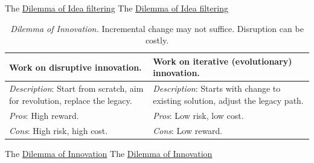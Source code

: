 The \href{table:idea-filtering}{Dilemma of Idea filtering}
The \href{table:idea-filtering}{Dilemma of Idea filtering}


\begin{center}
\begin{table}[H] %
\begin{tabular}{ | m{\dilemmatablewidth}| m{\dilemmatablewidth} | } 
  \hline
  \textbf{Work on disruptive innovation.} &
  \textbf{Work on iterative (evolutionary) innovation.} \\
  \hline
  \textit{Description}: Start from scratch, aim for revolution, replace the legacy.  &
  \textit{Description}: Starts with change to existing solution, adjust the legacy path.  \\  
  \hline
  \textit{Pros}: High reward. & 
  \textit{Pros}: Low risk, low cost. \\
  \hline
  \textit{Cons}: High risk, high cost. & 
  \textit{Cons}: Low reward. \\
  \hline
\end{tabular}
\caption{\textit{Dilemma of Innovation.}
Incremental change may not suffice. Disruption can be costly.
}
\label{table:disruptive-or-iterative}
\end{table}
\end{center}

The \href{table:disruptive-or-iterative}{Dilemma of Innovation}
The \href{table:disruptive-or-iterative}{Dilemma of Innovation}


